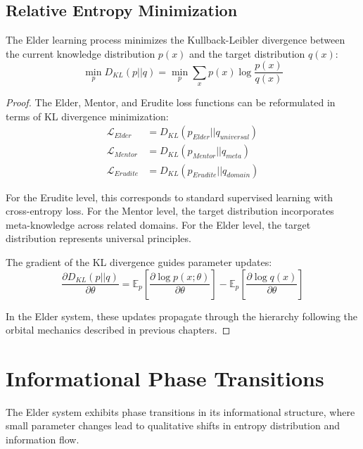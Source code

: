 \subsection{Relative Entropy Minimization}

\begin{theorem}
The Elder learning process minimizes the Kullback-Leibler divergence between the current knowledge distribution $p(x)$ and the target distribution $q(x)$:
\begin{equation}
\min_{p} D_{KL}(p || q) = \min_{p} \sum_x p(x) \log \frac{p(x)}{q(x)}
\end{equation}
\end{theorem}

\begin{proof}
The Elder, Mentor, and Erudite loss functions can be reformulated in terms of KL divergence minimization:
\begin{align}
\mathcal{L}_{Elder} &= D_{KL}(p_{Elder} || q_{universal}) \\
\mathcal{L}_{Mentor} &= D_{KL}(p_{Mentor} || q_{meta}) \\
\mathcal{L}_{Erudite} &= D_{KL}(p_{Erudite} || q_{domain})
\end{align}

For the Erudite level, this corresponds to standard supervised learning with cross-entropy loss. For the Mentor level, the target distribution incorporates meta-knowledge across related domains. For the Elder level, the target distribution represents universal principles.

The gradient of the KL divergence guides parameter updates:
\begin{equation}
\frac{\partial D_{KL}(p || q)}{\partial \theta} = \mathbb{E}_p\left[\frac{\partial \log p(x; \theta)}{\partial \theta}\right] - \mathbb{E}_p\left[\frac{\partial \log q(x)}{\partial \theta}\right]
\end{equation}

In the Elder system, these updates propagate through the hierarchy following the orbital mechanics described in previous chapters.
\end{proof}

\section{Informational Phase Transitions}

The Elder system exhibits phase transitions in its informational structure, where small parameter changes lead to qualitative shifts in entropy distribution and information flow.

